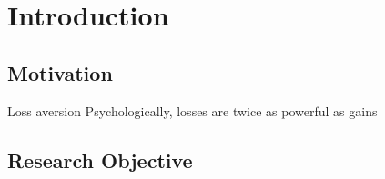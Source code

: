 \chapter{Introduction}

\section {Motivation}
Loss aversion Psychologically, losses are twice as powerful as gains \cite{Tversky1992}

\section {Research Objective}

\label{c:intro}

